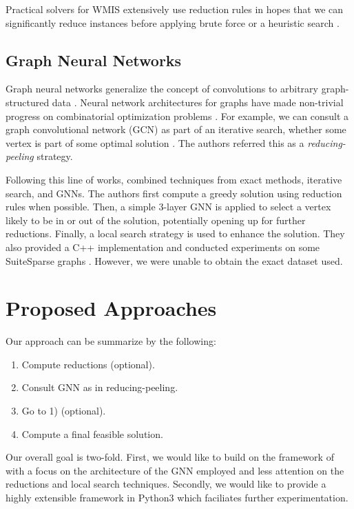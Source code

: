 \documentclass{article}
\begin{document}
Practical solvers for WMIS extensively use reduction rules
in hopes that we can significantly reduce instances
before applying brute force or a heuristic search \cite{kamis}.

\subsection{Graph Neural Networks}
Graph neural networks generalize the concept of convolutions to arbitrary graph-structured data \citet{scarselli2008graph}.
Neural network architectures for graphs have made non-trivial progress on combinatorial optimization problems \citet{cappart2021combinatorial}.
For example, we can consult a graph convolutional network (GCN) as part of an iterative search,
whether some vertex is part of some optimal solution \citet{comboptgcn}.
The authors referred this as a \emph{reducing-peeling} strategy.

Following this line of works,
\citet{langedal_et_al} combined techniques from exact methods,
iterative search,
and GNNs.
The authors first compute a greedy solution using reduction rules when possible.
Then, a simple 3-layer GNN is applied to select a vertex likely to be in or out of the solution,
potentially opening up for further reductions.
Finally, a local search strategy is used to enhance the solution.
They also provided a C++ implementation
and conducted experiments on some SuiteSparse graphs \citet{suitesparse}.
However, we were unable to obtain the exact dataset used.

\section{Proposed Approaches}
Our approach can be summarize by the following:
\begin{enumerate}[1)]
  \item Compute reductions (optional).
  \item Consult GNN as in reducing-peeling.
  \item Go to 1) (optional).
  \item Compute a final feasible solution.
\end{enumerate}
Our overall goal is two-fold.
First, we would like to build on the framework of \citet{langedal_et_al}
with a focus on the architecture of the GNN employed
and less attention on the reductions and local search techniques.
Secondly, we would like to provide a highly extensible framework in Python3
which faciliates further experimentation.
\end{document}
